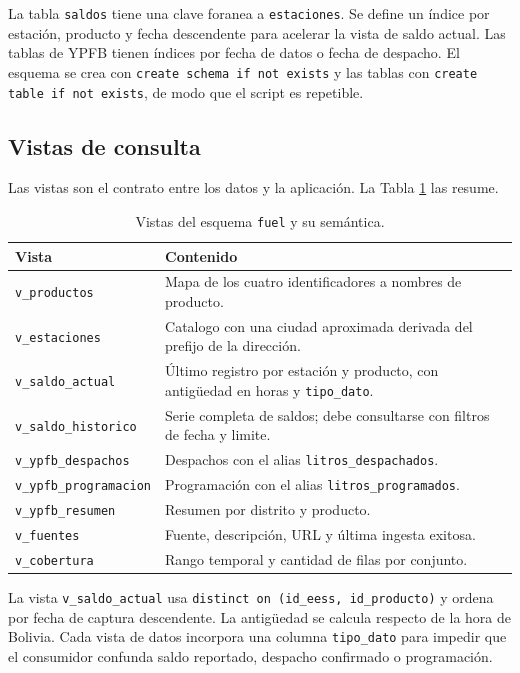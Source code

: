 \documentclass[12pt,a4paper]{article}
\newcommand{\fuel}{\texttt{fuel}}
\newcommand{\vista}[1]{\texttt{#1}}
\begin{document}
La tabla \texttt{saldos} tiene una clave foranea a \texttt{estaciones}. Se define un índice por estación, producto y fecha descendente para acelerar la vista de saldo actual. Las tablas de YPFB tienen índices por fecha de datos o fecha de despacho. El esquema se crea con \texttt{create schema if not exists} y las tablas con \texttt{create table if not exists}, de modo que el script es repetible.

\subsection{Vistas de consulta}

Las vistas son el contrato entre los datos y la aplicación. La Tabla \ref{tab:vistas} las resume.

\begin{table}[H]
\centering
\small
\caption{Vistas del esquema \fuel{} y su semántica.}
\label{tab:vistas}
\begin{tabularx}{\linewidth}{@{}l X@{}}
\toprule
\textbf{Vista} & \textbf{Contenido} \\
\midrule
\vista{v\_productos} & Mapa de los cuatro identificadores a nombres de producto. \\
\vista{v\_estaciones} & Catalogo con una ciudad aproximada derivada del prefijo de la dirección. \\
\vista{v\_saldo\_actual} & Último registro por estación y producto, con antigüedad en horas y \texttt{tipo\_dato}. \\
\vista{v\_saldo\_historico} & Serie completa de saldos; debe consultarse con filtros de fecha y limite. \\
\vista{v\_ypfb\_despachos} & Despachos con el alias \texttt{litros\_despachados}. \\
\vista{v\_ypfb\_programacion} & Programación con el alias \texttt{litros\_programados}. \\
\vista{v\_ypfb\_resumen} & Resumen por distrito y producto. \\
\vista{v\_fuentes} & Fuente, descripción, URL y última ingesta exitosa. \\
\vista{v\_cobertura} & Rango temporal y cantidad de filas por conjunto. \\
\bottomrule
\end{tabularx}
\end{table}

La vista \vista{v\_saldo\_actual} usa \texttt{distinct on (id\_eess, id\_producto)} y ordena por fecha de captura descendente. La antigüedad se calcula respecto de la hora de Bolivia. Cada vista de datos incorpora una columna \texttt{tipo\_dato} para impedir que el consumidor confunda saldo reportado, despacho confirmado o programación.
\end{document}
